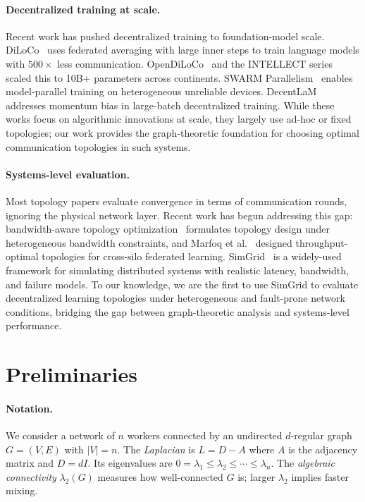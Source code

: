 \documentclass{article}
\newcommand{\lam}{\lambda_2}
\begin{document}
\paragraph{Decentralized training at scale.}
Recent work has pushed decentralized training to foundation-model
scale.  DiLoCo~\cite{douillard2024diloco} uses federated averaging
with large inner steps to train language models with $500\times$ less
communication.  OpenDiLoCo~\cite{jaghouar2024opendiloco} and the
INTELLECT series~\cite{prime2024intellect1} scaled this to 10B+
parameters across continents.
SWARM Parallelism~\cite{ryabinin2023swarm} enables model-parallel
training on heterogeneous unreliable devices.
DecentLaM~\cite{yuan2022decentlam} addresses momentum bias in
large-batch decentralized training.
While these works focus on algorithmic innovations at scale, they
largely use ad-hoc or fixed topologies; our work provides the
graph-theoretic foundation for choosing optimal communication
topologies in such systems.

\paragraph{Systems-level evaluation.}
Most topology papers evaluate convergence in terms of communication
rounds, ignoring the physical network layer.  Recent work has begun
addressing this gap: bandwidth-aware topology
optimization~\cite{bandwidthaware2025} formulates topology design under
heterogeneous bandwidth constraints, and Marfoq et
al.~\cite{marfoq2020throughput} designed throughput-optimal topologies
for cross-silo federated learning.
SimGrid~\cite{simgrid2014} is a widely-used framework for simulating
distributed systems with realistic latency, bandwidth, and failure
models.  To our knowledge, we are the first to use SimGrid to evaluate
decentralized learning topologies under heterogeneous and fault-prone
network conditions, bridging the gap between graph-theoretic analysis
and systems-level performance.


\section{Preliminaries}
\label{sec:prelim}

\paragraph{Notation.}
We consider a network of $n$ workers connected by an undirected $d$-regular
graph $G = (V, E)$ with $|V| = n$.  The \emph{Laplacian} is
$L = D - A$ where $A$ is the adjacency matrix and $D = dI$.
Its eigenvalues are $0 = \lambda_1 \le \lambda_2 \le \cdots \le \lambda_n$.
The \emph{algebraic connectivity} $\lam(G)$ measures how well-connected
$G$ is; larger $\lam$ implies faster mixing.
\end{document}
